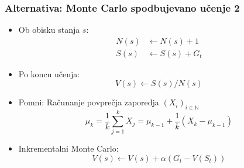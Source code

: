 \documentclass{beamer}    %
\begin{document}
\begin{frame}
    \frametitle{Alternativa: Monte Carlo spodbujevano učenje 2}
    \begin{itemize}
        \item Ob obisku stanja $s$: 
        \begin{align*}
            N(s) &\leftarrow N(s) + 1 \\
            S(s) &\leftarrow S(s) + G_t
        \end{align*}
        \item Po koncu učenja: 
        $$
        V(s) \leftarrow S(s) / N(s)
        $$
       \item Pomni: Računanje povprečja zaporedja $(X_i)_{i \in \mathbb{N}}$
       $$
       \mu_k = \frac{1}{k} \sum_{j=1}^k X_j = \mu_{k-1} + \frac{1}{k} (X_k - \mu_{k-1})
       $$
       \item Inkrementalni Monte Carlo:
       $$
       V(s) \leftarrow V(s) + \alpha (G_t - V(S_t))
       $$
    \end{itemize}
\end{frame}
\end{document}
